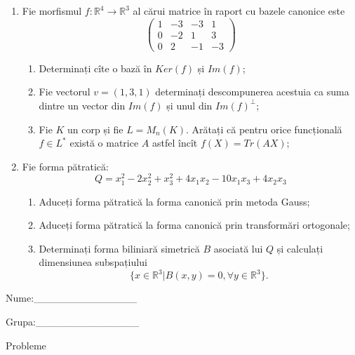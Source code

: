 \documentclass{article}
\begin{document}
\begin{enumerate}
 \item Fie morfismul $f:\mathbb{R}^4 \to \mathbb{R}^3$ al cărui matrice în raport cu bazele canonice este
$$\begin{pmatrix}
1&-3&-3&1\\
0&-2&1&3\\
0&2&-1&-3
\end{pmatrix}$$

\begin{enumerate}
\item Determinați cîte o bază în $Ker(f)$ și $Im(f)$;
\item Fie vectorul $v=(1,3,1)$ determinați descompunerea acestuia ca suma dintre un vector din $Im(f)$ și unul din $Im(f)^\perp$;
\item Fie $K$ un corp și fie $L=M_n(K)$. Arătați că pentru orice funcțională $f \in L^*$ există o matrice $A$ astfel încît $f(X)=Tr(AX)$;
\end{enumerate}
\item Fie forma pătratică:
$$Q= x_1^2-2x_2^2+x_3^2+4x_1x_2-10x_1x_3+4x_2x_3$$

\begin{enumerate}
\item Aduceți forma pătratică la forma canonică prin metoda Gauss;
\item Aduceți forma pătratică la forma canonică prin transformări ortogonale;
\item Determinați forma biliniară simetrică $B$ asociată lui $Q$ și calculați dimensiunea subspațiului
$$\{x \in \mathbb{R}^3 | B(x,y)=0,\forall y \in \mathbb{R}^3\}.$$

\end{enumerate}
\end{enumerate}
\newpage
\begin{flushright}
Nume:\_\_\_\_\_\_\_\_\_\_\_\_\_\_
 
 
Grupa:\_\_\_\_\_\_\_\_\_\_\_\_\_\_
\end{flushright}
\begin{center}
\vspace{2cm}
{\Large Probleme}
\vspace{2cm}
\end{center}
\end{document}
